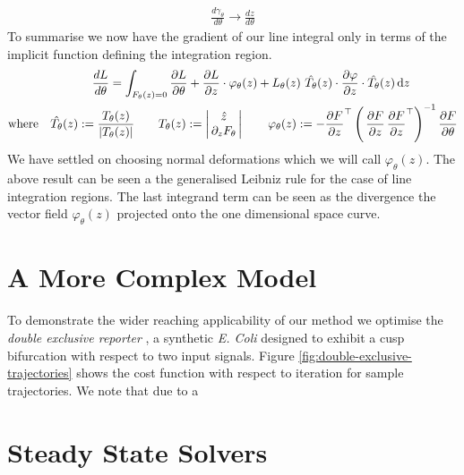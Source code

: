 \begin{align}
    \frac{d \gamma_{\theta}}{d\theta} \rightarrow \frac{d z}{d\theta}
\end{align}
To summarise we now have the gradient of our line integral only in terms of the implicit function defining the integration region.
\begin{align}
    \frac{d L}{d\theta} =\int_{F_{\theta}(z)=0}
        \frac{\partial L}{\partial\theta}+
        \frac{\partial L}{\partial z}\cdot
        \varphi_{\theta}(z)
    +L_{\theta}(z)\,\,
    \hat{T_{\theta}}(z)\cdot\frac{\partial \varphi}{\partial z}\cdot\hat{T_{\theta}}(z)
    \,\mathrm{d}z\qquad\qquad\\
    \mathrm{where}\quad
    \hat{T_{\theta}}(z):= \frac{T_{\theta}(z)}{|T_{\theta}(z)|}
    \qquad
    T_{\theta}(z):=
    \left|\begin{matrix}
        \hat{z} \\
        \,\partial_{z}F_{\theta}\,
    \end{matrix}\right|
    \qquad
    \varphi_{\theta}(z) :=
- \frac{\partial F}{\partial z}^\top
    \left(\,
        \frac{\partial F}{\partial z}\,\frac{\partial F}{\partial z}^\top
    \right)^{-1}
    \frac{\partial F}{\partial\theta}
\end{align}
We have settled on choosing normal deformations which we will call $\varphi_\theta(z)$. The above result can be seen a the generalised Leibniz rule \cite{Flanders1973DifferentiationSign} for the case of line integration regions. The last integrand term can be seen as the divergence the vector field $\varphi_\theta(z)$ projected onto the one dimensional space curve.

\section{A More Complex Model}
\label{appendix:double-exclusive}
To demonstrate the wider reaching applicability of our method we optimise the \emph{double exclusive reporter} \cite{Grant2020InterpretationCircuit}, a synthetic \emph{E. Coli} designed to exhibit a cusp bifurcation with respect to two input signals. Figure \ref{fig:double-exclusive-trajectories} shows the cost function with respect to iteration for sample trajectories. We note that due to a

\section{Steady State Solvers}
\label{appendix:stedy-state-solvers}